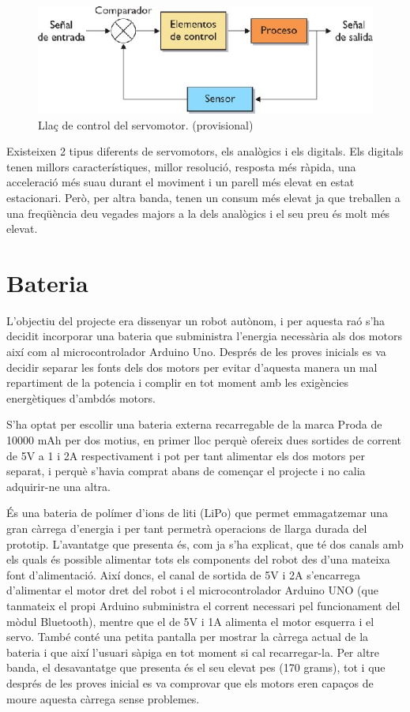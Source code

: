 \begin{figure}[H]
	\centering
	\includegraphics[scale=0.6]{llac-servo}
	\caption{Llaç de control del servomotor. (provisional)}
	\label{fig:llacservo}
\end{figure}

Existeixen 2 tipus diferents de servomotors, els analògics i els digitals. Els digitals tenen millors característiques, millor resolució, resposta més ràpida, una acceleració més suau durant el moviment i un parell més elevat en estat estacionari. Però, per altra banda, tenen un consum més elevat ja que treballen a una freqüència deu vegades majors a la dels analògics i el seu preu és molt més elevat. 

\section{Bateria}

L’objectiu del projecte era dissenyar un robot autònom, i per aquesta raó s’ha decidit incorporar una bateria que subministra l’energia necessària als dos motors així com al microcontrolador Arduino Uno. Després de les proves inicials es va decidir separar les fonts dels dos motors per evitar d’aquesta manera un mal repartiment de la potencia i complir en tot moment amb les exigències energètiques d’ambdós motors. 

S’ha optat per escollir una bateria externa recarregable de la marca Proda de 10000 mAh per dos motius, en primer lloc perquè ofereix dues sortides de corrent de 5V a 1 i 2A respectivament i pot per tant alimentar els dos motors per separat, i perquè s’havia comprat abans de començar el projecte i no calia adquirir-ne una altra. 

És una bateria de polímer d’ions de liti (LiPo) que permet emmagatzemar una gran càrrega d’energia i per tant permetrà operacions de llarga durada del prototip. L’avantatge que presenta és, com ja s’ha explicat, que té dos canals amb els quals és possible alimentar tots els components del robot des d'una mateixa font d'alimentació. Així doncs, el canal de sortida de 5V i 2A s’encarrega d’alimentar el motor dret del robot i el microcontrolador Arduino UNO (que tanmateix el propi Arduino subministra el corrent necessari pel funcionament del mòdul Bluetooth), mentre que el de 5V i 1A alimenta el motor esquerra i el servo. També conté una petita pantalla per mostrar la càrrega actual de la bateria i que així l’usuari sàpiga en tot moment si cal recarregar-la. Per altre banda, el desavantatge que presenta és el seu elevat pes (170 grams), tot i que després de les proves inicial es va comprovar que els motors eren capaços de moure aquesta càrrega sense problemes. 

